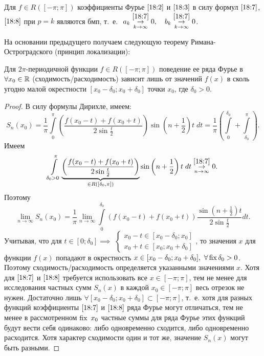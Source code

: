 \documentclass[../../main.tex]{subfiles}
\begin{document}
\begin{crl*}
	Для $f \in R([-\pi; \pi])$ коэффициенты Фурье $\eqref{18:2}$ и
	$\eqref{18:3}$ в силу формул $\eqref{18:7}$, $\eqref{18:8}$ при
	$p=k$ являются бмп, т.~е.
	$\ a_k \overset{\eqref{18:7}}{\underset
		{k \rightarrow \infty}{\rightarrow}} 0, \quad
	b_k \overset{\eqref{18:7}}{\underset
		{k \rightarrow \infty}{\rightarrow}} 0$.
\end{crl*}

\begin{rem}
	На основании предыдущего получаем следующую теорему 
	Римана-Остроградского (принцип локализации):
\end{rem}

\begin{thm}
	Для $2\pi$-периодичной функции $f\in R([-\pi;\pi])$ поведение
	ее ряда Фурье в $\forall x_0 \in \mathbb{R}$ (сходимость/расходимость) зависит
	лишь от значений $f(x)$ в сколь угодно малой окрестности
	$[x_0 - \delta_0; x_0 + \delta_0]$ точки $x_0$, где $\delta_0 > 0$.
\end{thm}

\begin{proof}
	В силу формулы Дирихле, имеем:
	\[S_n(x_0) = 
  \dfrac{1}{\pi}\int\limits_{0}^{\pi}\left(\dfrac{f(x_0 - t) + f(x_0 + t)}
	{2\sin{\frac{t}{2}}}\right)\sin\left(n+\frac{1}{2}\right)t\;dt = 
	\dfrac{1}{\pi}\left(\int\limits_{0}^{\delta_0} + 
	\int\limits_{\delta_0}^{\pi}\right).\]
	Имеем
	\[\int\limits_{\delta_0 > 0}^{\pi} \underbrace{\left(\dfrac{f(x_0 - t) + 
	f(x_0 + t)}
	{2\sin{\frac{t}{2}}}\right)}_{\in R([\delta_0, \pi])} 
	\sin\left(n+\frac{1}{2}\right)t\;dt 
	 \overset{\eqref{18:7}}{\underset
		{n \rightarrow \infty}{\rightarrow}} 0.\]
	Поэтому
	\[\lim\limits_{n \rightarrow \infty}{S_n(x_0)} = \dfrac{1}{\pi}
	\lim\limits_{n \rightarrow \infty}{\int\limits_{0}^{\delta_0}
	(f(x_0 - t) + f(x_0 + t)) \dfrac{\sin(n+\frac{1}{2})t}{
	2\sin\frac{t}{2}}}dt.\]
	Учитывая, что для $t \in [0; \delta_0 ] \implies$
	$\begin{cases}
		x_0 - t \in [x_0 - \delta_0; x_0] 
		\\
		x_0 + t \in [x_0; x_0 + \delta_0] 
	\end{cases}$,
	то значения $x$ для функции $f(x)$
	попадают в окрестность
	 $x \in [x_0 - \delta_0; x_0 + \delta_0],\ \forall \operatorname{fix} \delta_0 > 0$.
	 Поэтому сходимость/расходимость определяется указанными значениями $x$.
	 Хотя для $\eqref{18:7}$ и $\eqref{18:8}$ требуется использовать все
	 $x \in [-\pi; \pi]$, тем не менее для исследования частных сумм 
	 $S_n(x)$ в каждой $x_0 \in [-\pi; \pi]$ весь отрезок не нужен.
	 Достаточно лишь $\forall [x_0 - \delta_0; x_0 + \delta_0] \subset
	 [-\pi; \pi]$, т.~е. хотя для разных функций коэффициенты 
	 $\eqref{18:7}$ и $\eqref{18:8}$ ряда Фурье могут отличаться, 
	 тем не менее в рассмотренном $\operatorname{fix}\ x_0$ частные суммы для
	 ряда Фурье
	 этих функций будут вести себя одинаково: либо одновременно сходится, 
	 либо одновременно расходится.
	 Хотя характер сходимости один и тот же, значение $S_n(x)$ могут быть
	 разными.
\end{proof}
\end{document}
